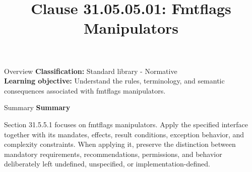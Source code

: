 \documentclass[10pt,letterpaper]{article}
\title{Clause 31.05.05.01: Fmtflags Manipulators}
\author{}
\date{}
\begin{document}
\maketitle
\begin{CornellOverviewBox}{Overview}
\textbf{Classification:} Standard library - Normative\\[2pt]
\textbf{Learning objective:} Understand the rules, terminology, and semantic consequences associated with fmtflags manipulators.
\end{CornellOverviewBox}\begin{CornellSummaryBox}{Summary}
{\sffamily\bfseries\color{Accent} Summary}\par\vspace{3pt}Section 31.5.5.1 focuses on fmtflags manipulators. Apply the specified interface together with its mandates, effects, result conditions, exception behavior, and complexity constraints. When applying it, preserve the distinction between mandatory requirements, recommendations, permissions, and behavior deliberately left undefined, unspecified, or implementation-defined.
\end{CornellSummaryBox}
\end{document}
